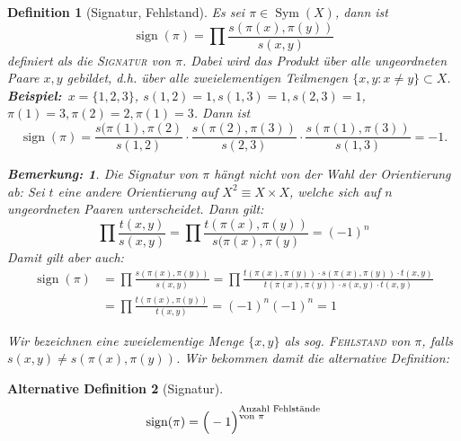 \documentclass{report}
\newcommand{\IN}[1]{\index{#1|BH}}
\DeclareMathOperator{\Sym}{Sym}
\DeclareMathOperator{\sign}{sign}
\theoremstyle{customrem}
\newtheorem*{bemerkung}{Bemerkung\textnormal:}
\theoremstyle{customdef}
\newtheorem{definition}{Definition}[chapter]
\newtheorem{definitionnn}[definition]{Alternative Definition}
\newcommand{\defemph}[1]{\textsc{#1}}
\begin{document}
	\begin{definition}[Signatur, Fehlstand]
		\IN{Signatur}
		\IN{Fehlstand}
		Es sei \(\pi\in\Sym(X)\), dann ist \[\sign(\pi)=\prod \frac{s(\pi(x), \pi(y))}{s(x, y)}\] definiert als die \defemph{Signatur} von \(\pi\). Dabei wird das Produkt über alle ungeordneten Paare \(x,y\) gebildet, d.h. über alle zweielementigen Teilmengen \(\{x,y:x\neq y\}\subset X\).\\
	
		\textbf{Beispiel:}\ \(x=\{1,2,3\}\), \(s(1,2)=1, s(1,3)=1, s(2,3)=1\), \(\pi(1)=3, \pi(2)=2, \pi(1)=3\). Dann ist \[\sign(\pi)=\frac{s(\pi(1), \pi(2)}{s(1, 2)}\cdot \frac{s(\pi(2), \pi(3))}{s(2, 3)}\cdot\frac{s(\pi(1), \pi(3))}{s(1, 3)} = -1.\]
		
		\begin{bemerkung}
			Die Signatur von \(\pi\) hängt nicht von der Wahl der Orientierung ab: Sei \(t\) eine andere Orientierung auf \(X^2\equiv X\times X\), welche sich auf \(n\) ungeordneten Paaren unterscheidet. Dann gilt: 
			\[\prod\frac{t(x, y)}{s(x, y)}=\prod\frac{t(\pi(x), \pi(y))}{s(\pi(x), \pi(y)}=(-1)^n\]
			Damit gilt aber auch:
			\begin{align*}
				\sign(\pi) &= \prod\frac{s(\pi(x), \pi(y))}{s(x, y)} = \prod\frac{t(\pi(x), \pi(y))\cdot s(\pi(x), \pi(y))\cdot t(x, y)}{t(\pi(x), \pi(y))\cdot s(x, y)\cdot t(x, y)}\\&=\prod\frac{t(\pi(x), \pi(y))}{t(x, y)}=(-1)^n(-1)^n=1
			\end{align*}
		\end{bemerkung}
		
		
		Wir bezeichnen eine zweielementige Menge \(\{x, y\}\) als sog. \defemph{Fehlstand} von \(\pi\), falls \(s(x, y)\neq s(\pi(x), \pi(y))\). Wir bekommen damit die alternative Definition:
	\end{definition}
	
	\begin{definitionnn}[Signatur]
		\[\sign(\pi) = \Big(-1\Big)^{\substack{\text{Anzahl Fehlstände}\\\text{von \(\pi\)\hspace{1.55cm}}}}\]
	\end{definitionnn}

\newpage
\renewcommand{\listtheoremname}{Satz- und Definitionsverzeichnis}
\listoftheorems[ignoreall, show={definition}, show={satz}, show={lemma}, show={definitionn}, show={korrolar}, show={definitionnn}]
\newpage
\printindex
\end{document}
